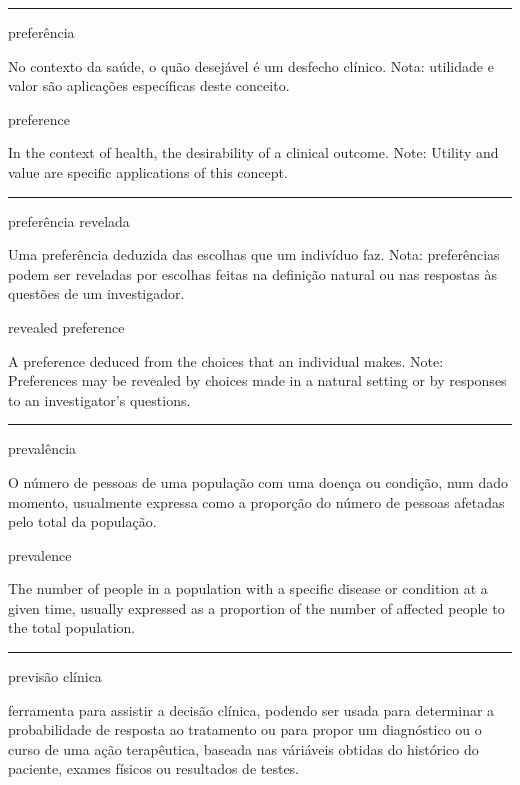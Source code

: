 \documentclass[
]{book}
\begin{document}
\begin{center}\rule{0.5\linewidth}{0.5pt}\end{center}

preferência

No contexto da saúde, o quão desejável é um desfecho clínico. Nota: utilidade e valor são aplicações específicas deste conceito.

preference

In the context of health, the desirability of a clinical outcome. Note: Utility and value are specific applications of this concept.

\begin{center}\rule{0.5\linewidth}{0.5pt}\end{center}

preferência revelada

Uma preferência deduzida das escolhas que um indivíduo faz. Nota: preferências podem ser reveladas por escolhas feitas na definição natural ou nas respostas às questões de um investigador.

revealed preference

A preference deduced from the choices that an individual makes. Note: Preferences may be revealed by choices made in a natural setting or by responses to an investigator's questions.

\begin{center}\rule{0.5\linewidth}{0.5pt}\end{center}

prevalência

O número de pessoas de uma população com uma doença ou condição, num dado momento, usualmente expressa como a proporção do número de pessoas afetadas pelo total da população.

prevalence

The number of people in a population with a specific disease or condition at a given time, usually expressed as a proportion of the number of affected people to the total population.

\begin{center}\rule{0.5\linewidth}{0.5pt}\end{center}

previsão clínica

ferramenta para assistir a decisão clínica, podendo ser usada para determinar a probabilidade de resposta ao tratamento ou para propor um diagnóstico ou o curso de uma ação terapêutica, baseada nas váriáveis obtidas do histórico do paciente, exames físicos ou resultados de testes.
\end{document}
